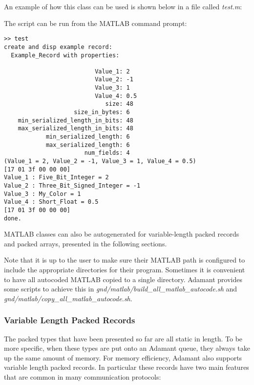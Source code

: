 An example of how this class can be used is shown below in a file called \textit{test.m}:


The script can be run from the MATLAB command prompt:

\vspace{5mm} %
\begin{verbatim}
>> test
create and disp example record:
  Example_Record with properties:

                          Value_1: 2
                          Value_2: -1
                          Value_3: 1
                          Value_4: 0.5
                             size: 48
                    size_in_bytes: 6
    min_serialized_length_in_bits: 48
    max_serialized_length_in_bits: 48
            min_serialized_length: 6
            max_serialized_length: 6
                       num_fields: 4
(Value_1 = 2, Value_2 = -1, Value_3 = 1, Value_4 = 0.5)
[17 01 3f 00 00 00]
Value_1 : Five_Bit_Integer = 2
Value_2 : Three_Bit_Signed_Integer = -1
Value_3 : My_Color = 1
Value_4 : Short_Float = 0.5
[17 01 3f 00 00 00]
done.
\end{verbatim}
\vspace{5mm} %

MATLAB classes can also be autogenerated for variable-length packed records and packed arrays, presented in the following sections.

Note that it is up to the user to make sure their MATLAB path is configured to include the appropriate directories for their program. Sometimes it is convenient to have all autocoded MATLAB copied to a single directory. Adamant provides some scripts to achieve this in \textit{gnd/matlab/build\_all\_matlab\_autocode.sh} and \textit{gnd/matlab/copy\_all\_matlab\_autocode.sh}.

\subsubsection{Variable Length Packed Records} \label{Variable Length Packed Records}

The packed types that have been presented so far are all static in length. To be more specific, when these types are put onto an Adamant queue, they always take up the same amount of memory. For memory efficiency, Adamant also supports variable length packed records. In particular these records have two main features that are common in many communication protocols:

